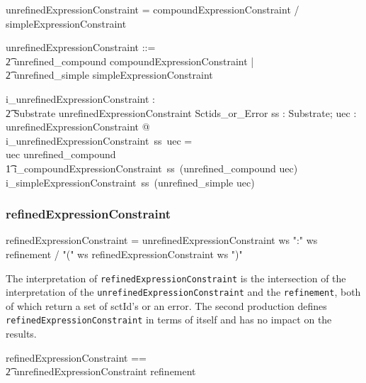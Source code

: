 \documentclass{article}
\def\spec#1{{\tt #1}}
\def\bnf#1{{\scriptsize {{#1}} }}
\begin{document}
\begin{framed}
\noindent
\bnf{unrefinedExpressionConstraint = compoundExpressionConstraint / simpleExpressionConstraint}
\end{framed}

\begin{zed}
unrefinedExpressionConstraint ::= \\
\t2 unrefined\_compound \ldata compoundExpressionConstraint \rdata | \\
\t2 unrefined\_simple \ldata simpleExpressionConstraint \rdata
\end{zed}
\begin{gendef}
   i\_unrefinedExpressionConstraint : \\
\t2 Substrate \fun unrefinedExpressionConstraint \fun Sctids\_or\_Error
\where
   \forall ss : Substrate; uec : unrefinedExpressionConstraint @  \\
   i\_unrefinedExpressionConstraint~ss~uec = \\
   \IF uec \in \ran unrefined\_compound \\
\t1 \THEN i\_compoundExpressionConstraint~ss~(unrefined\_compound \inv uec) \\
\ELSE  i\_simpleExpressionConstraint~ss~(unrefined\_simple \inv uec) 
\end{gendef}

\subsubsection{refinedExpressionConstraint}
\begin{framed}
\noindent
\bnf{refinedExpressionConstraint = unrefinedExpressionConstraint ws ":" ws refinement / "(" ws refinedExpressionConstraint ws ")"}
\end{framed}

The interpretation of \spec{refinedExpressionConstraint} is the intersection of the interpretation of
the \spec{unrefinedExpressionConstraint} and the \spec{refinement}, both of which return a set of sctId's or
an error.  The second production defines \spec{refinedExpressionConstraint} in terms of itself and has no impact on the results.

\begin{zed}
refinedExpressionConstraint == \\
\t2 unrefinedExpressionConstraint \cross refinement \\
[refinedExpressionConstraint']
\end{zed}
\end{document}
